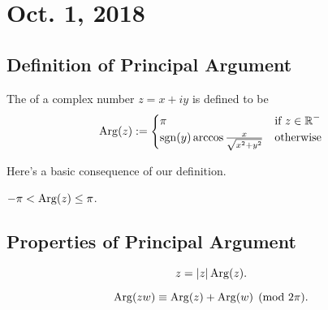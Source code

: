 \documentclass[notes]{subfile}
\begin{document}
\section{Oct. 1, 2018}

\subsection{Definition of Principal Argument}

\begin{definition}
    The  of a complex number 
    $z = x + iy$ is defined to be
    \[ {\operatorname{Arg}}(z) := \begin{cases}
    \pi & \text{if $z \in \operatorname{\mathbb{R}}^-$} \\
    {\operatorname{sgn}}(y) \arccos{\frac{x}{\sqrt{x^2+y^2}}} & \text{otherwise}
    \end{cases} \]
\end{definition}

Here's a basic consequence
of our definition.

\begin{theorem}
    $-\pi < {\operatorname{Arg}}(z) \le \pi$.
\end{theorem}

\subsection{Properties of Principal Argument}

\begin{theorem}
    \[ z = |z| \operatorname{Arg}(z). \] 
\end{theorem}

\begin{theorem}
    \[ \operatorname{Arg}(zw) \equiv \operatorname{Arg}(z) + \operatorname{Arg}(w) \pmod{2\pi}. \]
\end{theorem}
\end{document}
